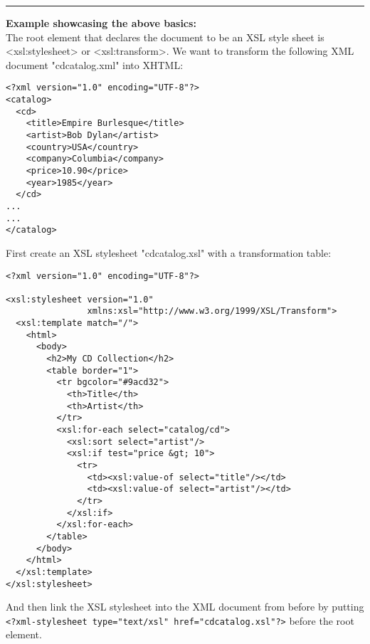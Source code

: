 \documentclass[11pt]{article}
\begin{document}
\noindent\rule{\textwidth}{0.5pt}
\textbf{Example showcasing the above basics:}\\
The root element that declares the document to be an XSL style sheet is <xsl:stylesheet> or <xsl:transform>. We want to transform the following XML document "cdcatalog.xml" into XHTML:
\lstset{breaklines=true,language=XML,label= ,caption= ,captionpos=b,numbers=none}
\begin{lstlisting}
<?xml version="1.0" encoding="UTF-8"?>
<catalog>
  <cd>
    <title>Empire Burlesque</title>
    <artist>Bob Dylan</artist>
    <country>USA</country>
    <company>Columbia</company>
    <price>10.90</price>
    <year>1985</year>
  </cd>
...
...
</catalog>
\end{lstlisting}
First create an XSL stylesheet "cdcatalog.xsl" with a transformation table:
\lstset{breaklines=true,language=XML,label= ,caption= ,captionpos=b,numbers=none}
\begin{lstlisting}
<?xml version="1.0" encoding="UTF-8"?>

<xsl:stylesheet version="1.0"
                xmlns:xsl="http://www.w3.org/1999/XSL/Transform">
  <xsl:template match="/">
    <html>
      <body>
        <h2>My CD Collection</h2>
        <table border="1">
          <tr bgcolor="#9acd32">
            <th>Title</th>
            <th>Artist</th>
          </tr>
          <xsl:for-each select="catalog/cd">
            <xsl:sort select="artist"/>
            <xsl:if test="price &gt; 10">
              <tr>
                <td><xsl:value-of select="title"/></td>
                <td><xsl:value-of select="artist"/></td>
              </tr>
            </xsl:if>
          </xsl:for-each>
        </table>
      </body>
    </html>
  </xsl:template>
</xsl:stylesheet>
\end{lstlisting}
And then link the XSL stylesheet into the XML document from before by putting \texttt{<?xml-stylesheet type="text/xsl" href="cdcatalog.xsl"?>} before the root element.
\end{document}
